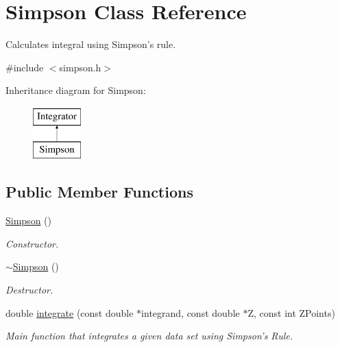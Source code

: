 \hypertarget{classSimpson}{
\section{Simpson Class Reference}
\label{d7/d99/classSimpson}
}


Calculates integral using Simpson's rule.  




{\ttfamily \#include $<$simpson.h$>$}

Inheritance diagram for Simpson:\begin{figure}[H]
\begin{center}
\leavevmode
\includegraphics[height=2cm]{d7/d99/classSimpson}
\end{center}
\end{figure}
\subsection*{Public Member Functions}
\begin{DoxyCompactItemize}
\item 
\hypertarget{classSimpson_a67630263e3dafdfaa033f566324b4799}{
\hyperlink{classSimpson_a67630263e3dafdfaa033f566324b4799}{Simpson} ()}
\label{d7/d99/classSimpson_a67630263e3dafdfaa033f566324b4799}

\begin{DoxyCompactList}\small\item\em Constructor. \item\end{DoxyCompactList}\item 
\hypertarget{classSimpson_a92c73e59a11fdf7a156b3682676de6b8}{
\hyperlink{classSimpson_a92c73e59a11fdf7a156b3682676de6b8}{$\sim$Simpson} ()}
\label{d7/d99/classSimpson_a92c73e59a11fdf7a156b3682676de6b8}

\begin{DoxyCompactList}\small\item\em Destructor. \item\end{DoxyCompactList}\item 
double \hyperlink{classSimpson_ab90da2fb197efe2f4a669bf5029a16f4}{integrate} (const double $\ast$integrand, const double $\ast$Z, const int ZPoints)
\begin{DoxyCompactList}\small\item\em Main function that integrates a given data set using Simpson's Rule. \item\end{DoxyCompactList}\end{DoxyCompactItemize}



